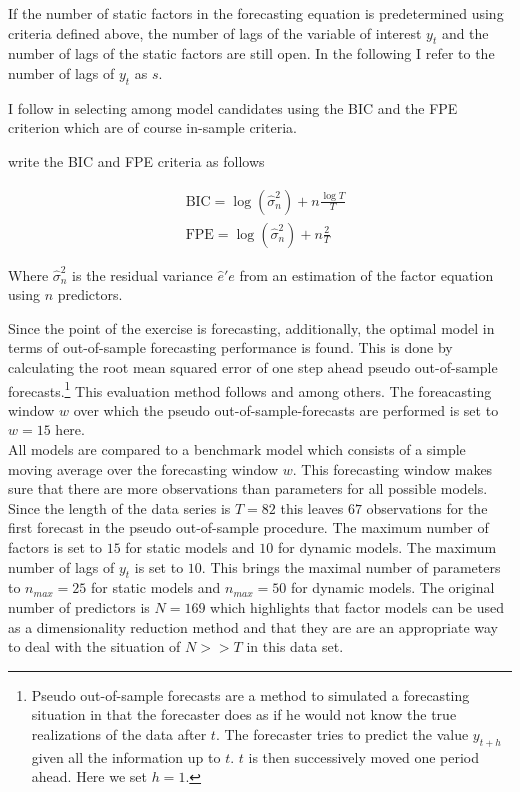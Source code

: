 \documentclass[12pt]{article}
\begin{document}
If the number of static factors in the forecasting equation is predetermined using criteria defined above, the number of lags of the variable of interest $y_t$ and the number of lags of the static factors are still open. In the following I refer to the number of lags of $y_t$ as $s$. 

I follow \citet{bai2008forecasting} in selecting among model candidates using the BIC and the FPE criterion which are of course in-sample criteria. 

\citet{bai2008forecasting} write the BIC and FPE criteria as follows

\begin{equation}
\label{information criteria}
\begin{split}
	& \text{BIC} = \log(\hat \sigma_n^2) + n \frac{\log T}{T} \\ 
	& \text{FPE} = \log(\hat \sigma_n^2) + n \frac{2}{T}
\end{split}
\end{equation}

Where $\hat \sigma_n^2$ is the residual variance $\hat e'e$ from an estimation of the factor equation using $n$ predictors.

Since the point of the exercise is forecasting, additionally, the optimal model in terms of out-of-sample forecasting performance is found. This is done by calculating the root mean squared error of one step ahead pseudo out-of-sample forecasts.\footnote{Pseudo out-of-sample forecasts are a method to simulated a forecasting situation in that the forecaster does as if he would not know the true realizations of the data after $t$. The forecaster tries to predict the value $y_{t+h}$ given all the information up to $t$. $t$ is then successively moved one period ahead. Here we set $h=1$.} This evaluation method follows \citet{forni2005the} and \citet{bai2008forecasting} among others. The foreacasting window $w$ over which the pseudo out-of-sample-forecasts are performed is set to $w=15$ here. \\


All models are compared to a benchmark model which consists of a simple moving average over the forecasting window $w$. This forecasting window makes sure that there are more observations than parameters for all possible models. Since the length of the data series is $T=82$ this leaves $67$ observations for the first forecast in the pseudo out-of-sample procedure. The maximum number of factors is set to $15$ for static models and $10$ for dynamic models. The maximum number of lags of $y_t$ is set to $10$. This brings the maximal number of parameters to $n_{max} = 25$ for static models and $n_{max} = 50$ for dynamic models. The original number of predictors is $N = 169$ which highlights that factor models can be used as a dimensionality reduction method and that they are are an appropriate way to deal with the situation of $N>>T$ in this data set.
\end{document}
